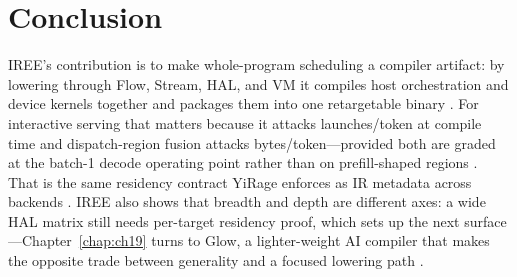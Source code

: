 \section{Conclusion}
\label{sec:ch18_conclusion}

IREE's contribution is to make whole-program scheduling a compiler artifact: by lowering through Flow, Stream, HAL, and VM it compiles host orchestration and device kernels together and packages them into one retargetable binary \citep{iree2024}. For interactive serving that matters because it attacks launches/token at compile time and dispatch-region fusion attacks bytes/token---provided both are graded at the batch-1 decode operating point rather than on prefill-shaped regions \citep{taxbreak2026,memoryfloor2026}. That is the same residency contract YiRage enforces as IR metadata across backends \citep{yirage2026}. IREE also shows that breadth and depth are different axes: a wide HAL matrix still needs per-target residency proof, which sets up the next surface---Chapter~\ref{chap:ch19} turns to Glow, a lighter-weight AI compiler that makes the opposite trade between generality and a focused lowering path \citep{dlbook}.

